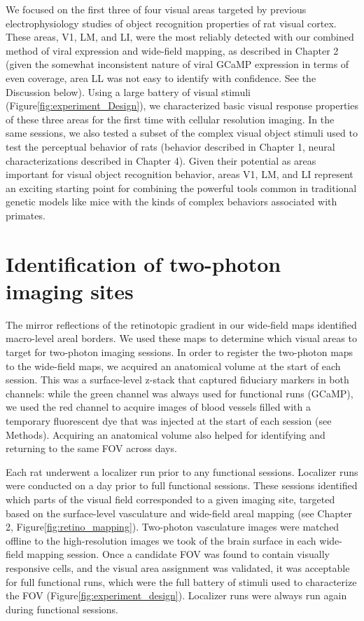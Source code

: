 We focused on the first three of four visual areas targeted by previous electrophysiology studies of object recognition properties of rat visual cortex. These areas, V1, LM, and LI, were the most reliably detected with our combined method of viral expression and wide-field mapping, as described in Chapter 2 (given the somewhat inconsistent nature of viral GCaMP expression in terms of even coverage, area LL was not easy to identify with confidence. See the Discussion below). Using a large battery of visual stimuli (Figure\ref{fig:experiment_Design}), we characterized basic visual response properties of these three areas for the first time with cellular resolution imaging. In the same sessions, we also tested a subset of the complex visual object stimuli used to test the perceptual behavior of rats (behavior described in Chapter 1, neural characterizations described in Chapter 4). Given their potential as areas important for visual object recognition behavior, areas V1, LM, and LI  represent an exciting starting point for combining the powerful tools common in traditional genetic models like mice with the kinds of complex behaviors associated with primates.  

\section{Identification of two-photon imaging sites}
The mirror reflections of the retinotopic gradient in our wide-field maps identified macro-level areal borders. We used these maps to determine which visual areas to target for two-photon imaging sessions. In order to register the two-photon maps to the wide-field maps, we acquired an anatomical volume at the start of each session. This was a surface-level z-stack that captured fiduciary markers in both channels: while the green channel was always used for functional runs (GCaMP), we used the red channel to acquire images of blood vessels filled with a temporary fluorescent dye that was injected at the start of each session (see Methods). Acquiring an anatomical volume also helped for identifying and returning to the same FOV across days. 

Each rat underwent a localizer run prior to any functional sessions. Localizer runs were conducted on a day prior to full functional sessions. These sessions identified which parts of the visual field corresponded to a given imaging site, targeted based on the surface-level vasculature and wide-field areal mapping (see Chapter 2, Figure\ref{fig:retino_mapping}). Two-photon vasculature images were matched offline to the high-resolution images we took of the brain surface in each wide-field mapping session. Once a candidate FOV was found to contain visually responsive cells, and the visual area assignment was validated, it was acceptable for full functional runs, which were the full battery of stimuli used to characterize the FOV (Figure\ref{fig:experiment_design}). Localizer runs were always run again during functional sessions.

